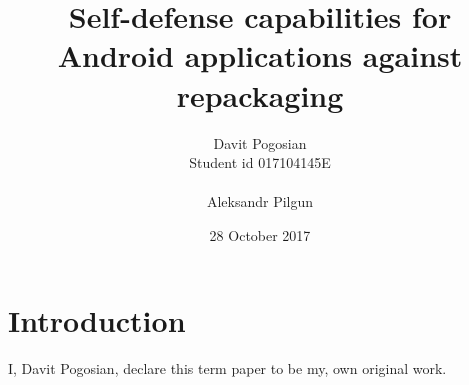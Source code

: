 \documentclass[12pt]{article}
\title{Self-defense capabilities for Android applications against repackaging}
\author{Davit Pogosian\\Student id 017104145E\\\\ Aleksandr Pilgun}
\date{28 October 2017}
\begin{document}
	\maketitle
	

	\section{Introduction}

I, Davit Pogosian, declare this term paper to be my, own original work.
\end{document}
